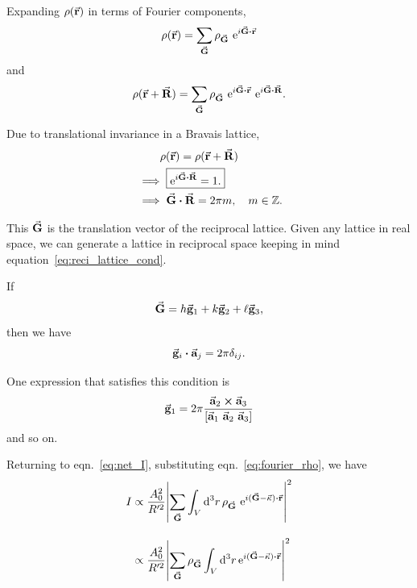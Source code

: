 	Expanding $\rho(\va{r})$ in terms of Fourier components,%
%		
	\begin{equation}
	\rho(\va{r}) = \sum_{\va{G}} \rho_{\va{G}} ~ \e{ i \va{G} \vdot \va{r} } \label{eq:fourier_rho}
	\end{equation}
%	
	and%
%	
	\begin{equation}
	\rho(\va{r} + \va{R}) = \sum_{\va{G}} \rho_{\va{G}} ~ \e{ i \va{G} \vdot \va{r} } ~ \e{ i \va{G} \vdot \va{R} }.
	\end{equation}
	
	Due to translational invariance in a Bravais lattice,%
%	
	\begin{align}
	&\phantom{\implies} \rho (\va{r}) = \rho( \va{r} + \va{R} ) \nonumber \\
	&\implies \boxed{ \e{i \va{G} \vdot \va{R} } = 1.} \\ \label{eq:reci_lattice_cond}
	&\implies \va{G} \vdot \va{R} = 2\pi m, \quad m \in \mathbb{Z}.
	\end{align}
	
	This $\va{G}$ is the translation vector of the reciprocal lattice. Given any lattice in real space, we can generate a lattice in reciprocal space keeping in mind equation~\eqref{eq:reci_lattice_cond}.
	
	If%
%	
	\begin{equation}
	\va{G} = h \va{g}_1 + k \va{g}_2 + \ell \va{g}_3,\label{eq:reci_lattice_vec}
	\end{equation}%
%	
	then we have%
%	
	\begin{equation}
	\va{g}_i \vdot \va{a}_j = 2\pi \delta_{ij}.\label{eq:relation_g_a}
	\end{equation}%
	
	One expression that satisfies this condition is%
%	
	\begin{equation}
	\va{g}_1 = 2\pi \dfrac{\va{a}_2 \cross \va{a}_3}{\qty[ \va{a}_1 ~ \va{a}_2 ~ \va{a}_3 ]} \label{eq:g_from_a}
	\end{equation}%
%	
	and so on.
	
	Returning to eqn.~\eqref{eq:net_I}, substituting eqn.~\eqref{eq:fourier_rho}, we have%
%	
	\begin{align}
	I &\propto \dfrac{A_0^2}{R'^2} \abs{ \sum_{\va{G}} \int_V \dd[3]{r} \rho_{\va{G}} ~ \e{ i (\va{G} - \va{\kappa}) \vdot \va{r} } }  ^2 \nonumber \\[1em]
	  &\propto \dfrac{A_0^2}{R'^2} \abs{ \sum_{\va{G}} \rho_{\va{G}} \int_V \dd[3]{r} \e{ i (\va{G} - \va{\kappa}) \vdot \va{r} } }^2
	\end{align}%
	

